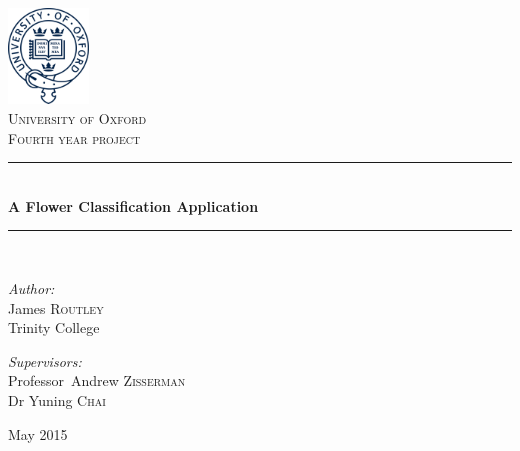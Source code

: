 \documentclass[11pt, a4paper]{report}
\newcommand{\HRule}{\rule{\linewidth}{0.5mm}}
\begin{document}
\begin{titlepage}
\begin{center}

\includegraphics[width=0.16\textwidth]{img/OxfLogo.png}~\\[1.5cm]

\textsc{\LARGE University of Oxford}\\[1.5cm]
\textsc{\Large Fourth year project}\\[0.5cm]

\HRule \\[0.4cm]
{ \huge \bfseries A Flower Classification Application \\[0.4cm] }

\HRule \\[1.5cm]

\noindent
\begin{minipage}[t]{0.4\textwidth}
\begin{flushleft} \large
\emph{Author:}\\
James \textsc{Routley} \\
Trinity College
\end{flushleft}
\end{minipage}%
\begin{minipage}[t]{0.4\textwidth}
\begin{flushright} \large
\emph{Supervisors:} \\
Professor~Andrew \textsc{Zisserman} \\
Dr Yuning \textsc{Chai}
\end{flushright}
\end{minipage}

\vfill

{\large May 2015}

\end{center}
\end{titlepage}
\end{document}
